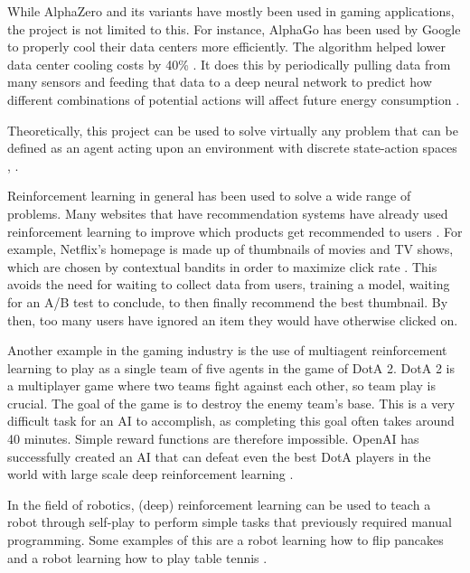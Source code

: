 \documentclass{article}
\begin{document}
While AlphaZero and its variants have mostly been used in gaming applications, 
the project is not limited to this. For instance, AlphaGo has been used by Google
to properly cool their data centers more efficiently. The algorithm helped lower
data center cooling costs by 40\% \cite{decemberHasGoogleCracked2020}. 
It does this by periodically pulling data from many sensors and feeding that data to 
a deep neural network to predict how different combinations of potential actions
will affect future energy consumption \cite{HowAIHelps2018}.

Theoretically, this project can be used to solve virtually any problem that can be
defined as an agent acting upon an environment with discrete state-action spaces \cite{ReinforcementLearning2022a}, \cite{nbroAnswerAreThere2020}.

Reinforcement learning in general has been used to solve a wide range of problems.
Many websites that have recommendation systems have already used reinforcement learning 
to improve which products get recommended to users \cite{nbroAnswerAreThere2020}. 
For example, Netflix's homepage is made up of thumbnails of movies and TV shows, which are chosen 
by contextual bandits in order to maximize click rate \cite{blogArtworkPersonalizationNetflix2017,surmenokContextualBanditsReinforcement2017}.
This avoids the need for waiting to collect data from users, training a model,
waiting for an A/B test to conclude, to then finally recommend the best thumbnail.
By then, too many users have ignored an item they would have otherwise clicked on.

Another example in the gaming industry is the use of multiagent reinforcement learning 
to play as a single team of five agents in the game of DotA 2. DotA 2 is a multiplayer game where 
two teams fight against each other, so team play is crucial. The goal of the game is to destroy the 
enemy team's base. This is a very difficult task for an AI to accomplish, as completing this goal often takes 
around 40 minutes. Simple reward functions are therefore impossible. OpenAI has successfully created 
an AI that can defeat even the best DotA players in the world with large scale deep reinforcement 
learning \cite{openaiDotaLargeScale2019,OpenAIFive2019}.

In the field of robotics, (deep) reinforcement learning can be used to teach a robot
through self-play to perform simple tasks that previously required manual programming.
Some examples of this are a robot learning how to flip pancakes \cite{petarkormushevRobotLearnsFlip2010}
and a robot learning how to play table tennis \cite{mpikybrollLearningRobotTable2012}.
\end{document}
